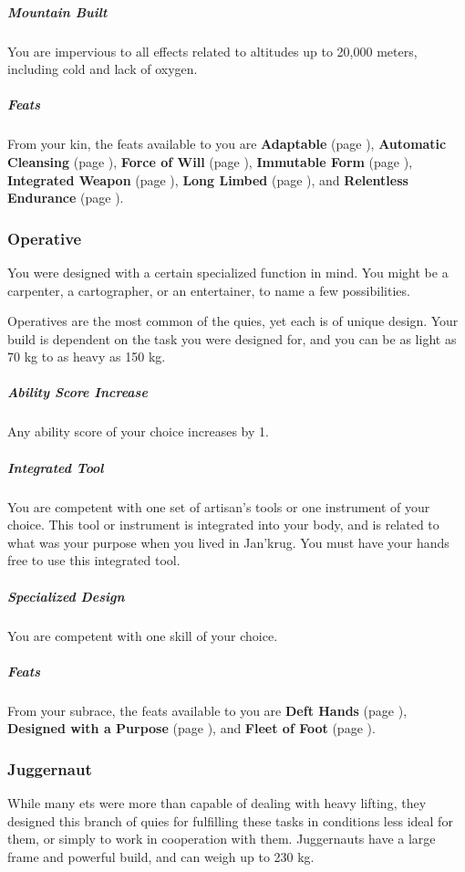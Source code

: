     \subparagraph{Mountain Built} You are impervious to all effects related to altitudes up to 20,000 meters, including cold and lack of oxygen.

    \subparagraph{Feats} From your kin, the feats available to you are
    \textbf{Adaptable} (page \pageref{feat::adaptable}),
    \textbf{Automatic Cleansing} (page \pageref{feat::automaticcleansing}),
    \textbf{Force of Will} (page \pageref{feat::forceofwill}),
    \textbf{Immutable Form} (page \pageref{feat::immutableform}),
    \textbf{Integrated Weapon} (page \pageref{feat::integratedweapon}),
    \textbf{Long Limbed} (page \pageref{feat::longlimbed}), and
    \textbf{Relentless Endurance} (page \pageref{feat::relentlessendurance}).

\subsubsection{Operative}
    You were designed with a certain specialized function in mind.
    You might be a carpenter, a cartographer, or an entertainer, to name a few possibilities.

    Operatives are the most common of the quies, yet each is of unique design.
    Your build is dependent on the task you were designed for, and you can be as light as 70 kg to as heavy as 150 kg.

    \subparagraph{Ability Score Increase} Any ability score of your choice increases by 1.

    \subparagraph{Integrated Tool} You are competent with one set of artisan's tools or one instrument of your choice.
    This tool or instrument is integrated into your body, and is related to what was your purpose when you lived in Jan'krug.
    You must have your hands free to use this integrated tool.

    \subparagraph{Specialized Design} You are competent with one skill of your choice.

    \subparagraph{Feats} From your subrace, the feats available to you are
    \textbf{Deft Hands} (page \pageref{feat::defthands}),
    \textbf{Designed with a Purpose} (page \pageref{feat::designedwithapurpose}), and
    \textbf{Fleet of Foot} (page \pageref{feat::fleetoffoot}).

\subsubsection{Juggernaut}
    While many ets were more than capable of dealing with heavy lifting, they designed this branch of quies for fulfilling these tasks in conditions less ideal for them, or simply to work in cooperation with them.
    Juggernauts have a large frame and powerful build, and can weigh up to 230 kg.

